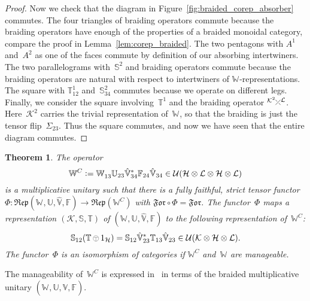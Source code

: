 \documentclass[a4paper]{amsart}
\numberwithin{equation}{section}
\theoremstyle{plain}
\newtheorem{theorem}{Theorem}
\numberwithin{theorem}{section}
\theoremstyle{definition}
\theoremstyle{remark}
\newcommand{\tenscorep}{\mathbin{\begin{tikzpicture}[baseline,x=.75ex,y=.75ex] \draw[line width=.2pt] (-0.8,1.15)--(0.8,1.15);\draw[line width=.2pt](0,-0.25)--(0,1.15); \draw[line width=.2pt] (0,0.75) circle [radius = 1];\end{tikzpicture}}}
\newcommand*{\Dualbraiding}[2]{\begin{tikzpicture}[baseline]
    \draw[-] (1.4ex,0) -- (0,1.4ex) node[left,inner sep=0pt] {$\scriptstyle #1$};
    \draw[-,draw=white,line width=2.4pt] (0,0) -- (1.4ex,1.4ex);
    \draw[-] (0,0) -- (1.4ex,1.4ex) node[right,inner sep=0pt] {$\scriptstyle #2$};
  \end{tikzpicture}}
\newcommand*{\Corep}[1]{\mathbb{#1}}          %
\newcommand*{\DuCorep}[1]{\hat{\Corep{#1}}}   %
\newcommand*{\Corepcat}[1]{\mathfrak{Rep}(#1)}%
\newcommand*{\Forget}{\mathfrak{For}}%
\newcommand*{\nb}{\nobreakdash}
\newcommand*{\Multunit}[1][]{\mathbb W^{#1}}%
\newcommand*{\BrMultunit}{\mathbb F}%
\newcommand*{\Hils}[1][H]{\mathcal{#1}}%
\newcommand*{\U}{\mathcal U}%
\newcommand*{\defeq}{\mathrel{\vcentcolon=}}
\begin{document}
\begin{proof}
  Now we check that the diagram in
  Figure~\ref{fig:braided_corep_absorber} commutes.
  The four triangles of braiding
  operators commute
  because the braiding operators have enough of the properties of a
  braided monoidal category, compare the proof in
  Lemma~\ref{lem:corep_braided}.  The two pentagons with \(A^1\)
  and~\(A^2\) as one of the faces commute by definition of our
  absorbing intertwiners.  The two parallelograms
  with~\(\Corep{S}^2\) and braiding operators commute because the
  braiding operators are natural with respect to intertwiners of
  \(\Multunit\)\nb-representations.  The square with
  \(\Corep{T}^1_{12}\) and~\(\Corep{S}^2_{34}\) commutes because we
  operate on different legs.  Finally, we consider the square
  involving~\(\Corep{T}^1\) and the braiding operator
  \(\Dualbraiding{\Hils[K]^2}{\Hils[L]}\).  Here~\(\Hils[K]^2\)
  carries the trivial representation of~\(\Multunit\), so
  that the braiding is just the tensor flip~\(\Sigma_{23}\).  Thus
  the square commutes, and now we have seen that the entire diagram
  commutes.
\end{proof}

\begin{theorem}
  \label{the:braided_to_multunit}
  The operator
  \[
  \Multunit[C] \defeq \Multunit_{13} \Corep{U}_{23} \DuCorep{V}_{34}^*
  \BrMultunit_{24} \DuCorep{V}_{34}
  \in\U(\Hils\otimes\Hils[L]\otimes\Hils\otimes\Hils[L])
  \]
  is a multiplicative unitary such that there is a fully faithful,
  strict tensor functor
  \(\Phi\colon \Corepcat{\Multunit,\Corep{U},\DuCorep{V},\BrMultunit}
  \to \Corepcat{\Multunit[C]}\)
  with \(\Forget\circ \Phi = \Forget\).
  The functor~\(\Phi\)
  maps a representation \((\Hils[K],\Corep{S},\Corep{T})\)
  of \((\Multunit,\Corep{U},\DuCorep{V},\BrMultunit)\)
  to the following representation of~\(\Multunit[C]\):
  \[
  \Corep{S}_{12} (\Corep{T}\tenscorep1_{\Hils})
  = \Corep{S}_{12} \DuCorep{V}_{23}^* \Corep{T}_{13} \DuCorep{V}_{23}
  \in \U(\Hils[K]\otimes\Hils\otimes\Hils[L]).
  \]
  The functor~\(\Phi\)
  is an isomorphism of categories if \(\Multunit[C]\)
  and~\(\Multunit\) are manageable.
\end{theorem}

The manageability of~\(\Multunit[C]\) is expressed
in~\cite{Meyer-Roy-Woronowicz:Qgrp_proj} in terms of the braided
multiplicative unitary
\((\Multunit,\Corep{U},\DuCorep{V},\BrMultunit)\).
\end{document}
